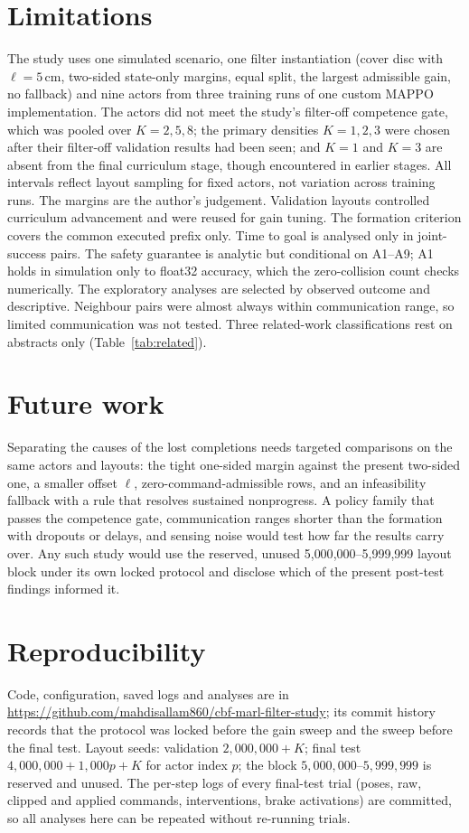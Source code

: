\documentclass[11pt]{article}
\begin{document}
\section{Limitations}
The study uses one simulated scenario, one filter instantiation (cover disc with $\ell=5$\,cm,
two-sided state-only margins, equal split, the largest admissible gain, no fallback) and nine actors from
three training runs of one custom MAPPO implementation. The actors did not meet the study's filter-off
competence gate, which was pooled over $K=2,5,8$; the primary densities $K=1,2,3$ were chosen after
their filter-off validation results had been seen; and $K=1$ and $K=3$ are absent from the final
curriculum stage, though encountered in earlier stages. All intervals reflect layout sampling
for fixed actors, not variation across training runs. The margins are the author's judgement.
Validation layouts controlled curriculum advancement and were reused for gain tuning. The formation
criterion covers the common executed prefix only. Time to goal is analysed only in joint-success pairs.
The safety guarantee is analytic but conditional on A1--A9; A1 holds in simulation only to float32
accuracy, which the zero-collision count checks numerically. The exploratory analyses are selected by
observed outcome and descriptive.
Neighbour pairs were almost always within communication range, so limited communication was not
tested. Three related-work classifications rest on abstracts only (Table~\ref{tab:related}).

\section{Future work}
Separating the causes of the lost completions needs targeted comparisons on the same actors and
layouts: the tight one-sided margin against the present two-sided one, a smaller offset $\ell$,
zero-command-admissible rows, and an infeasibility fallback with a rule that resolves sustained
nonprogress. A policy family that passes the competence gate, communication ranges shorter than the
formation with dropouts or delays, and sensing noise would test how far the results carry over. Any such study would use the reserved, unused
5{,}000{,}000--5{,}999{,}999 layout block under its own locked protocol and disclose which of the
present post-test findings informed it.

\section{Reproducibility}
{\sloppy Code, configuration, saved logs and analyses are in \url{https://github.com/mahdisallam860/cbf-marl-filter-study}; its commit history records that the
protocol was locked before the gain sweep and the sweep before the final test. Layout seeds: validation $2{,}000{,}000+K$; final test
$4{,}000{,}000+1{,}000p+K$ for actor index $p$; the block $5{,}000{,}000$--$5{,}999{,}999$ is reserved and
unused. The per-step logs of every final-test trial (poses, raw, clipped and applied commands,
interventions, brake activations) are committed, so all analyses here can be repeated without
re-running trials.\par}
\end{document}

